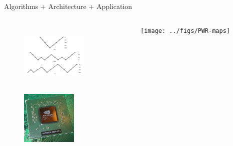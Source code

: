 \documentclass[xcolor=x11names,compress]{beamer}
\renewcommand{\(}{\begin{columns}}
\renewcommand{\)}{\end{columns}}
\newcommand{\<}[1]{\begin{column}{#1}}
\renewcommand{\>}{\end{column}}
\begin{document}
\begin{frame}{Algorithms + Architecture + Application}

    \begin{columns}
    \begin{column}{0.5\textwidth}
    
 	   \begin{center}
 	   \begin{figure}     
 	   \includegraphics[height=1.25in, width=1.25in, clip]{../figs/multigridFig}
 	   \end{figure}
 	   \begin{figure} 
 	   \includegraphics[height=1in,clip]{../figs/GPU}
       \end{figure}
 	   \end{center}

  	\end{column}
 	\begin{column}{0.5\textwidth}
 	   \begin{center}
 	   \begin{figure}
 	   \texttt{[image: ../figs/PWR-maps]}
       \end{figure}
 	   \end{center}
  	\end{column}
	\end{columns}
	
\end{frame}
\end{document}
